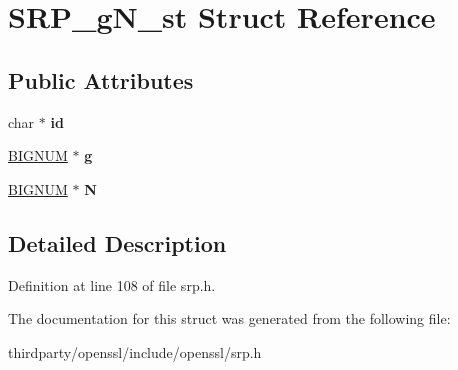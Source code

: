 \hypertarget{struct_s_r_p__g_n__st}{}\section{S\+R\+P\+\_\+g\+N\+\_\+st Struct Reference}
\label{struct_s_r_p__g_n__st}
\subsection*{Public Attributes}
\begin{DoxyCompactItemize}
\item 
\mbox{\label{struct_s_r_p__g_n__st_a26863009016da8a8a42ee5d50977327a}} 
char $\ast$ {\bfseries id}
\item 
\mbox{\label{struct_s_r_p__g_n__st_a4527dc1f493a42d33e790a86775ee7d2}} 
\hyperlink{structbignum__st}{B\+I\+G\+N\+UM} $\ast$ {\bfseries g}
\item 
\mbox{\label{struct_s_r_p__g_n__st_a4f8b9c2a5b4d2957f8a2d5702722d0ad}} 
\hyperlink{structbignum__st}{B\+I\+G\+N\+UM} $\ast$ {\bfseries N}
\end{DoxyCompactItemize}


\subsection{Detailed Description}


Definition at line 108 of file srp.\+h.



The documentation for this struct was generated from the following file\+:\begin{DoxyCompactItemize}
\item 
thirdparty/openssl/include/openssl/srp.\+h\end{DoxyCompactItemize}
